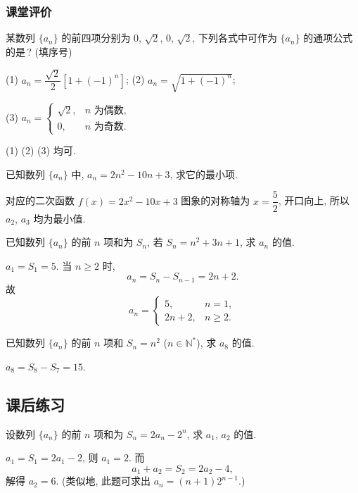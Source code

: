 \subsubsection{课堂评价}
\begin{exercise}
    某数列 $\{a_n\}$ 的前四项分别为 $0$, $\sqrt{2}$, $0$, $\sqrt2$, 
    下列各式中可作为 $\{a_n\}$ 的通项公式的是\,? (填序号)
    
    (1) $a_n= \dfrac{\sqrt2}2 [1+(-1)^n]$;\qquad
    (2) $a_n= \sqrt{1+(-1)^n}$;
    
    (3) $a_n= \begin{cases}
      \sqrt2, & \text{$n$ 为偶数},\\
      0, & \text{$n$ 为奇数}.\end{cases}$
\end{exercise}
\beginsolution
    (1) (2) (3) 均可.
\endsolution

\begin{exercise}
    已知数列 $\{a_n\}$ 中, $a_n = 2n^2 -10n+3$, 求它的最小项.
\end{exercise}
\beginsolution
    对应的二次函数 $f(x)= 2x^2-10x+3$ 图象的对称轴为 $x= \dfrac52$, 开口向上, 所以 $a_2$, $a_3$ 均为最小值. 
\endsolution

\begin{exercise}
    已知数列 $\{a_n\}$ 的前 $n$ 项和为 $S_n$, 若 $S_n= n^2 +3n+1$, 求 $a_n$ 的值.
\end{exercise}
\beginsolution
    $a_1= S_1= 5$. 当 $n\geqslant 2$ 时, 
    \[a_n= S_n-S_{n-1}= 2n+2.\]
    故 
    \[a_n= \begin{cases}
        5, & n=1,\\
        2n+2, & n\geqslant 2.
    \end{cases}\]
\endsolution

\begin{exercise}
    已知数列 $\{a_n\}$ 的前 $n$ 项和 $S_n =n^2$ ($n\in\mathbb{N}^*$), 求 $a_8$ 的值.
\end{exercise}
\beginsolution
    $a_8= S_8-S_7= 15$.
\endsolution

\subsection{课后练习}
\begin{exercise}
    设数列 $\{a_n\}$ 的前 $n$ 项和为 $S_n =2a_n -2^n$, 求 $a_1$, $a_2$ 的值.
\end{exercise}
\beginsolution
    $a_1= S_1= 2a_1-2$, 则 $a_1=2$. 而
    \[a_1+a_2= S_2= 2a_2-4,\]
    解得 $a_2=6$. (类似地, 此题可求出 $a_n=(n+1)2^{n-1}$.)
\endsolution

